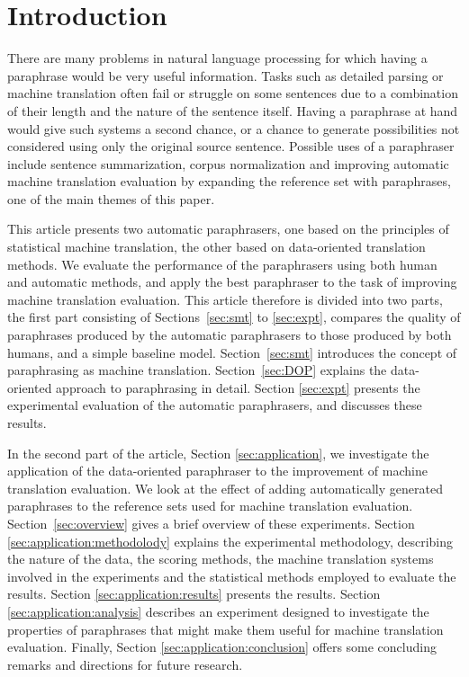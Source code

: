 



\maketitle

\section{Introduction}

There are many problems in natural language processing for which having a paraphrase would be very useful
information. Tasks such as detailed parsing or  machine translation often fail or struggle on some sentences due
to a combination of their length and the nature of the sentence itself.  Having a paraphrase at hand would give
such systems a second chance, or  a chance to generate possibilities not considered using only the original
source sentence. Possible uses of a paraphraser include sentence summarization, corpus normalization and
improving automatic machine translation evaluation by expanding the reference set with paraphrases, one of the
main themes of this paper.

This article presents two automatic paraphrasers, one based on the principles of 
statistical machine translation, the other based on data-oriented translation methods.
We evaluate the performance of the paraphrasers using both human and automatic methods,
and apply the best paraphraser to the task of improving machine translation evaluation.
This article therefore is divided into two parts, 
the first part consisting of Sections~\ref{sec:smt} to \ref{sec:expt},
compares the quality of paraphrases produced by the automatic paraphrasers to those
produced by both humans, and a simple baseline model.
Section~\ref{sec:smt} introduces the concept of paraphrasing as machine translation. Section~\ref{sec:DOP}
explains the data-oriented approach to paraphrasing in detail. Section \ref{sec:expt} presents the experimental
evaluation of the automatic paraphrasers, and discusses these results.


In the second part of the article, Section \ref{sec:application}, we investigate the application of the
data-oriented paraphraser to the improvement of machine translation evaluation. We look at the effect of adding
automatically generated paraphrases to the reference sets used for machine translation evaluation. 
Section~\ref{sec:overview} gives a brief overview of these experiments. Section
\ref{sec:application:methodolody} explains the experimental methodology, describing the nature of the data, the
scoring methods, the machine translation systems involved in the experiments and the statistical methods
employed to evaluate the results. Section \ref{sec:application:results} presents the results. 
Section \ref{sec:application:analysis} describes an experiment designed to investigate the properties
of paraphrases that might make them  useful for machine translation evaluation. Finally, Section
\ref{sec:application:conclusion} offers some concluding remarks and directions for future research.

